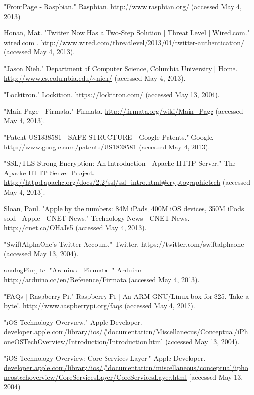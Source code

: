 \documentclass[10pt]{article}
\begin{document}
\begin{multicols}{2}
\begin{thebibliography}{99}
"FrontPage - Raspbian." Raspbian. \url{http://www.raspbian.org/} (accessed May 4, 2013).

Honan, Mat. "Twitter Now Has a Two-Step Solution | Threat Level | Wired.com." wired.com . \url{http://www.wired.com/threatlevel/2013/04/twitter-authentication/} (accessed May 4, 2013).

"Jason Nieh." Department of Computer Science, Columbia University | Home. \url{http://www.cs.columbia.edu/~nieh/} (accessed May 4, 2013).

"Lockitron." Lockitron. \url{https://lockitron.com/} (accessed May 13, 2004).

"Main Page - Firmata." Firmata. \url{http://firmata.org/wiki/Main_Page} (accessed May 4, 2013).

"Patent US1838581 - SAFE STRUCTURE - Google Patents." Google. \url{http://www.google.com/patents/US1838581} (accessed May 4, 2013).

"SSL/TLS Strong Encryption: An Introduction - Apache HTTP Server." The Apache HTTP Server Project. \url{http://httpd.apache.org/docs/2.2/ssl/ssl_intro.html#cryptographictech} (accessed May 4, 2013).

Sloan, Paul. "Apple by the numbers: 84M iPads, 400M iOS devices, 350M iPods sold | Apple - CNET News." Technology News - CNET News. \url{http://cnet.co/OHaJs5} (accessed May 4, 2013).

"SwiftAlphaOne's Twitter Account." Twitter. \url{https://twitter.com/swiftalphaone} (accessed May 13, 2004).

analogPin;, te. "Arduino - Firmata ." Arduino. \url{http://arduino.cc/en/Reference/Firmata} (accessed May 4, 2013).

"FAQs  | Raspberry Pi." Raspberry Pi | An ARM GNU/Linux box for \$25. Take a byte!. \url{http://www.raspberrypi.org/faqs} (accessed May 4, 2013).

"iOS Technology Overview." Apple Developer. \url{developer.apple.com/library/ios/#documentation/Miscellaneous/Conceptual/iPhoneOSTechOverview/Introduction/Introduction.html} (accessed May 13, 2004).

"iOS Technology Overview: Core Services Layer." Apple Developer. \url{developer.apple.com/library/ios/#documentation/miscellaneous/conceptual/iphoneostechoverview/CoreServicesLayer/CoreServicesLayer.html} (accessed May 13, 2004).


\end{thebibliography}
\end{multicols}
\end{document}
